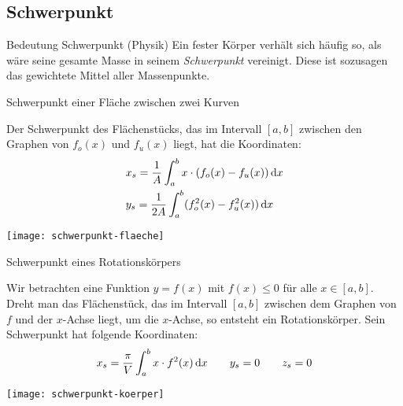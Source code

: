 \subsection{Schwerpunkt}\label{subsec:schwerpunkt}

\begin{definition}{Bedeutung Schwerpunkt (Physik)}
    Ein fester Körper verhält sich häufig so, als wäre seine gesamte Masse in seinem \emph{Schwerpunkt} vereinigt.
    Diese ist sozusagen das gewichtete Mittel aller Massenpunkte.
\end{definition}

\begin{definition}{Schwerpunkt einer Fläche zwischen zwei Kurven}
    \begin{multicols}{2}
        Der Schwerpunkt des Flächenstücks, das im Intervall $[a,b]$ zwischen den Graphen von $f_o(x)$ und $f_u(x)$ liegt, hat die Koordinaten:
        \begin{align*}
            &x_s = \frac{1}{A} \int_{a}^{b} x \cdot (f_o(x) - f_u(x)) \,\mathrm{d}x \\
            &y_s = \frac{1}{2A} \int_{a}^{b} (f_o^2(x) - f_u^2(x)) \,\mathrm{d}x
        \end{align*}
        \begin{center}
            \texttt{[image: schwerpunkt-flaeche]}
        \end{center}
    \end{multicols}
\end{definition}

\begin{definition}{Schwerpunkt eines Rotationskörpers}
    \begin{multicols}{2}
        Wir betrachten eine Funktion $y = f(x)$ mit $f(x) \leq 0$ für alle $x \in [a,b]$.
        Dreht man das Flächenstück, das im Intervall $[a,b]$ zwischen dem Graphen von $f$ und der $x$-Achse liegt, um die $x$-Achse, so entsteht ein Rotationskörper.
        Sein Schwerpunkt hat folgende Koordinaten:
        \[x_s = \frac{\pi}{V} \int_{a}^{b} x \cdot f^2(x) \,\mathrm{d}x \quad\quad y_s = 0 \quad\quad z_s = 0\]
        \begin{center}
            \texttt{[image: schwerpunkt-koerper]}
        \end{center}
    \end{multicols}
\end{definition}